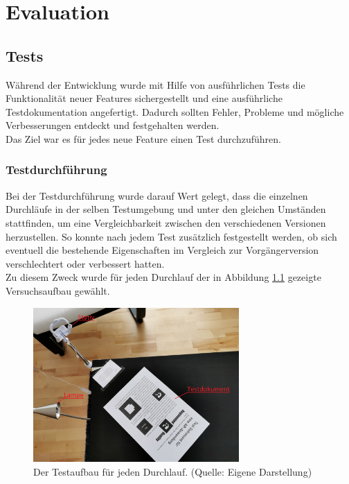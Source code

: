 \chapter{Evaluation}\label{chapter:Evaluation}

\section{Tests}\label{sec:Tests}
Während der Entwicklung wurde mit Hilfe von ausführlichen Tests die Funktionalität neuer Features sichergestellt und eine ausführliche Testdokumentation angefertigt. Dadurch sollten Fehler, Probleme und mögliche Verbesserungen entdeckt und festgehalten werden. \\
Das Ziel war es für jedes neue Feature einen Test durchzuführen.\\


\subsection{Testdurchführung}\label{sec:Testdurchführung}
Bei der Testdurchführung wurde darauf Wert gelegt, dass die einzelnen Durchläufe in der selben Testumgebung und unter den gleichen Umständen stattfinden, um eine Vergleichbarkeit zwischen den verschiedenen Versionen herzustellen.
So konnte nach jedem Test zusätzlich festgestellt werden, ob sich eventuell die bestehende Eigenschaften im Vergleich zur Vorgängerversion verschlechtert oder verbessert hatten. \\
Zu diesem Zweck wurde für jeden Durchlauf der in Abbildung \ref{fig:Testaufbau} gezeigte Versuchsaufbau gewählt.

\begin{figure}[h!]
\centering
\includegraphics[width=0.7\textwidth]{Abbildungen/Testaufbau.jpeg}
\caption[Testaufbau]{Der Testaufbau für jeden Durchlauf. (Quelle: Eigene Darstellung)}
\label{fig:Testaufbau}
\end{figure}

